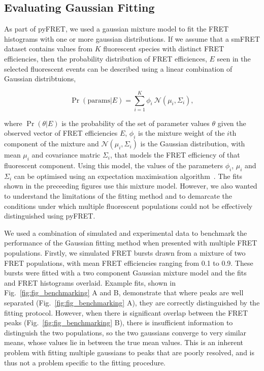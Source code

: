 \subsection{Evaluating Gaussian Fitting}
As part of pyFRET, we used a gaussian mixture model to fit the FRET histograms with one or more gaussian distributions. If we assume that a smFRET dataset contains values from $K$ fluorescent species with distinct FRET efficiencies, then the probability distribution of FRET efficiences, $E$ seen in the selected fluorescent events can be described using a linear combination of Gaussian distribtuions, 

\begin{equation}
\Pr(\text{params}|E) = \sum_{i=1}^K \phi_i~\mathcal{N}(\mu_i, \Sigma_i),
\label{eq:gmm}
\end{equation}

where $\Pr(\theta|E)$ is the probability of the set of parameter values $\theta$ given the observed vector of FRET efficiencies $E$, $\phi_i$ is the mixture weight of the $i$th component of the mixture and $\mathcal{N}(\mu_i, \Sigma_i)$ is the Gaussian distribution, with mean $\mu_i$ and covariance matric $\Sigma_i$, that models the FRET efficiency of that fluorescent component. Using this model, the values of the parameters $\phi_i$, $\mu_i$ and $\Sigma_i$ can be optimised using an expectation maximisation algorithm~\cite{Guoshen2012}. The fits shown in the preceeding figures use this mixture model. However, we also wanted to understand the limitations of the fitting method and to demarcate the conditions under which multiple fluorescent populations could not be effectively distinguished using pyFRET. 

We used a combination of simulated and experimental data to benchmark the performance of the Gaussian fitting method when presented with multiple FRET populations. Firstly, we simulated FRET bursts drawn from a mixture of two FRET populations, with mean FRET efficiencies ranging from 0.1 to 0.9. These bursts were fitted with a two component Gaussian mixture model and the fits and FRET histograms overlaid. Example fits, shown in Fig.~\ref{fig:fig_benchmarking} A and B, demonstrate that where peaks are well separated (Fig.~\ref{fig:fig_benchmarking} A), they are correctly distinguished by the fitting protocol. However, when there is significant overlap between the FRET peaks (Fig.~\ref{fig:fig_benchmarking} B), there is insufficient information to distinguish the two populations, so the two gaussians converge to very similar means, whose values lie in between the true mean values. This is an inherent problem with fitting multiple gaussians to peaks that are poorly resolved, and is thus not a problem specific to the fitting procedure.

